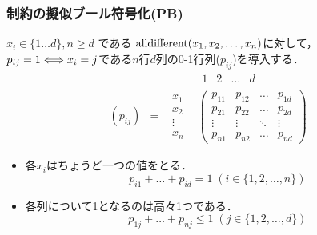 \begin{frame}
    \frametitle{{\alldiff}制約の擬似ブール符号化(PB)}
    \begin{exampleblock}{}
        $x_i \in \{ 1 \dots d \}, n \geq d$ である $\textrm{alldifferent}(x_1,x_2,\ldots,x_n)$に対して，$p_{ij}=1 \Longleftrightarrow x_i=j$である$n$行$d$列の0-1行列($p_{ij}$)を導入する．
        \begin{displaymath}
            \begin{array}{cccc}
             & & &
             \begin{array}{cccc}
                 1&2&\dots&d
             \end{array}\\
                (p_{ij})&=&
                \begin{array}{c}x_1\\ x_2\\ \vdots\\ x_n \end{array}&
                \left(
                    \begin{array}{cccc}
                        p_{11}&p_{12}&\dots&p_{1d}\\
                        p_{21}&p_{22}&\dots&p_{2d}\\
                        \vdots&\vdots&\ddots&\vdots\\
                        p_{n1}&p_{n2}&\dots&p_{nd}
                \end{array}\right)
            \end{array}
        \end{displaymath}
        \begin{itemize}
            \item 各$x_i$はちょうど一つの値をとる．
            \vspace{-3mm}
            $$ p_{i1} + \ldots + p_{id} = 1 \; (i \in \{1,2,\ldots,n\})$$
            \item 各列について1となるのは高々1つである．
            \vspace{-3mm}
            $$ p_{1j} + \ldots + p_{nj} \leq 1 \; (j \in \{1,2,\ldots,d\})$$
        \end{itemize}
    \end{exampleblock}
\end{frame}

